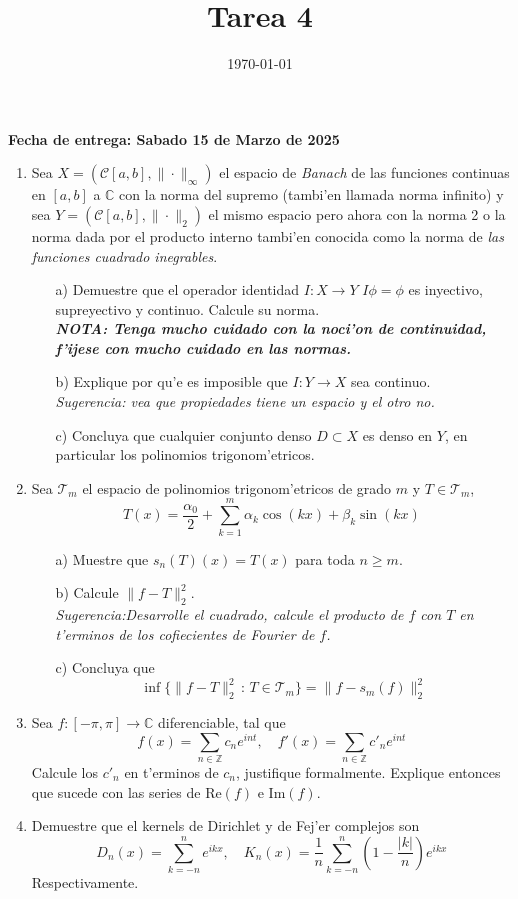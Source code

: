 \documentclass[letterpaper]{article}
\date{\today}
\title{Tarea 4}
\newcommand{\zah}{\ensuremath{ \mathbb Z }}
\newcommand{\co}{\ensuremath{\mathbb C }}
\begin{document}
\maketitle

\textbf{Fecha de entrega: Sabado 15 de Marzo de 2025}

\begin{enumerate}
  \item Sea \(X=(\mathcal{C}[a,b],\|\cdot\|_{\infty})\) el espacio de \emph{Banach} de las funciones continuas en \([a,b]\) a \(\co\) con la norma del supremo (tambi'en llamada norma infinito) y sea \(Y=(\mathcal{C}[a,b],\|\cdot\|_{2})\) el mismo espacio pero ahora con la norma 2 o la norma dada por el producto interno tambi'en conocida como la norma de \emph{las funciones cuadrado inegrables}.
        \begin{itemize}
          \item[a)] Demuestre que el operador identidad \(I:X\to Y\) \(I\phi=\phi\) es inyectivo, supreyectivo y continuo. Calcule su norma.\\
            \emph{\textbf{NOTA: Tenga mucho cuidado con la noci'on de continuidad, f'ijese con mucho cuidado en las normas.}}
          \item[b)] Explique por qu'e es imposible que \(I:Y\to X\) sea continuo.\\
            \emph{Sugerencia: vea que propiedades tiene un espacio y el otro no.}
          \item[c)] Concluya que cualquier conjunto denso \(D\subset X\) es denso en \(Y\), en particular los polinomios trigonom'etricos.
        \end{itemize}
  \item Sea \(\mathcal{T}_{m}\) el espacio de polinomios trigonom'etricos de grado \(m\) y \(T\in\mathcal{T}_{m}\),
        \[
        T(x)=\frac{\alpha_{0}}{2}+\sum_{k=1}^{m}\alpha_{k}\cos(kx)+\beta_{k}\sin(kx)
        \]
        \begin{itemize}
          \item[a)] Muestre que \(s_{n}(T)(x)=T(x)\) para toda \(n\geq m\).
          \item[b)] Calcule \(\|f-T\|^{2}_{2}\).\\
                \emph{Sugerencia:Desarrolle el cuadrado, calcule el producto de \(f\) con \(T\) en t'erminos de los cofiecientes de Fourier de \(f\).}
          \item[c)] Concluya que
                \[
                \inf\{\|f-T\|^{2}_{2}\,:\,T\in\mathcal{T}_{m}\}=\|f-s_{m}(f)\|^{2}_{2}
                \]
        \end{itemize}
  \item Sea \(f:[-\pi,\pi]\to\co\) diferenciable, tal que
        \[
        f(x)=\sum_{n\in\zah}c_{n}e^{int},\quad f'(x)=\sum_{n\in\zah}c'_{n}e^{int}
        \]
        Calcule los \(c'_{n}\) en t'erminos de \(c_{n}\), justifique formalmente. Explique entonces que sucede con las series de \(\mathrm{Re}(f)\) e \(\mathrm{Im}(f)\).
  \item Demuestre que el kernels de  Dirichlet y de Fej'er complejos son
        \[
        D_{n}(x)=\sum_{k=-n}^{n}e^{ikx},\quad K_{n}(x)=\frac{1}{n}\sum_{k=-n}^{n}\left(1-\frac{|k|}{n}\right)e^{ikx}
        \]
        Respectivamente.
\end{enumerate}
\end{document}
